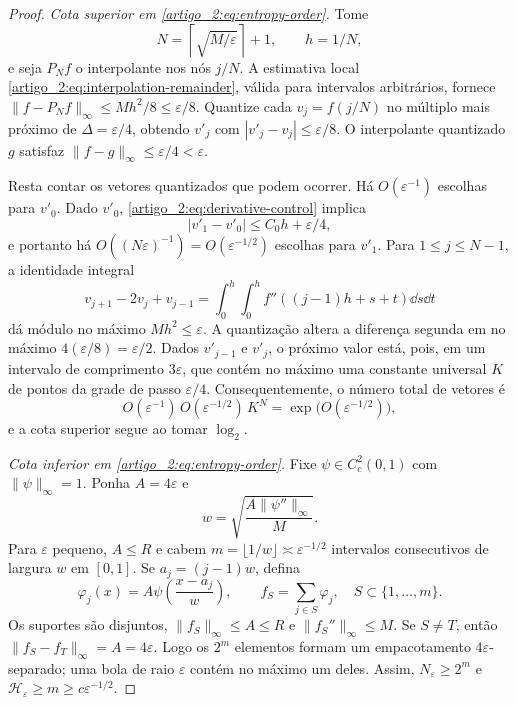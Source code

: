\begin{proof}
\emph{Cota superior em \eqref{artigo_2:eq:entropy-order}.} Tome
\[
 N=\left\lceil\sqrt{M/\varepsilon}\right\rceil+1,\qquad h=1/N,
\]
e seja $P_Nf$ o interpolante nos nós $j/N$. A estimativa local \eqref{artigo_2:eq:interpolation-remainder}, válida para intervalos arbitrários, fornece $\|f-P_Nf\|_\infty\le Mh^2/8\le\varepsilon/8$. Quantize cada $v_j=f(j/N)$ no múltiplo mais próximo de $\Delta=\varepsilon/4$, obtendo $v'_j$ com $|v'_j-v_j|\le\varepsilon/8$. O interpolante quantizado $g$ satisfaz $\|f-g\|_\infty\le\varepsilon/4<\varepsilon$.

Resta contar os vetores quantizados que podem ocorrer. Há $O(\varepsilon^{-1})$ escolhas para $v'_0$. Dado $v'_0$, \eqref{artigo_2:eq:derivative-control} implica
\[
 |v'_1-v'_0|\le C_0h+\varepsilon/4,
\]
e portanto há $O((N\varepsilon)^{-1})=O(\varepsilon^{-1/2})$ escolhas para $v'_1$. Para $1\le j\le N-1$, a identidade integral
\[
 v_{j+1}-2v_j+v_{j-1}
 =\int_0^h\int_0^h
 f''((j-1)h+s+t)\dd s\dd t
\]
dá módulo no máximo $Mh^2\le\varepsilon$. A quantização altera a diferença segunda em no máximo $4(\varepsilon/8)=\varepsilon/2$. Dados $v'_{j-1}$ e $v'_j$, o próximo valor está, pois, em um intervalo de comprimento $3\varepsilon$, que contém no máximo uma constante universal $K$ de pontos da grade de passo $\varepsilon/4$. Consequentemente, o número total de vetores é
\[
 O(\varepsilon^{-1})\,O(\varepsilon^{-1/2})\,K^N
 =\exp\bigl(O(\varepsilon^{-1/2})\bigr),
\]
e a cota superior segue ao tomar $\log_2$.

\emph{Cota inferior em \eqref{artigo_2:eq:entropy-order}.} Fixe $\psi\in C_c^2(0,1)$ com $\|\psi\|_\infty=1$. Ponha $A=4\varepsilon$ e
\[
 w=\sqrt{\frac{A\|\psi''\|_\infty}{M}}.
\]
Para $\varepsilon$ pequeno, $A\le R$ e cabem $m=\lfloor1/w\rfloor\asymp\varepsilon^{-1/2}$ intervalos consecutivos de largura $w$ em $[0,1]$. Se $a_j=(j-1)w$, defina
\[
 \varphi_j(x)=A\psi\!\left(\frac{x-a_j}{w}\right),\qquad
 f_S=\sum_{j\in S}\varphi_j,\quad S\subset\{1,\ldots,m\}.
\]
Os suportes são disjuntos, $\|f_S\|_\infty\le A\le R$ e $\|f_S''\|_\infty\le M$. Se $S\neq T$, então $\|f_S-f_T\|_\infty=A=4\varepsilon$. Logo os $2^m$ elementos formam um empacotamento $4\varepsilon$-separado; uma bola de raio $\varepsilon$ contém no máximo um deles. Assim, $N_\varepsilon\ge2^m$ e $\mathcal{H}_\varepsilon\ge m\ge c\varepsilon^{-1/2}$.


\end{proof}
